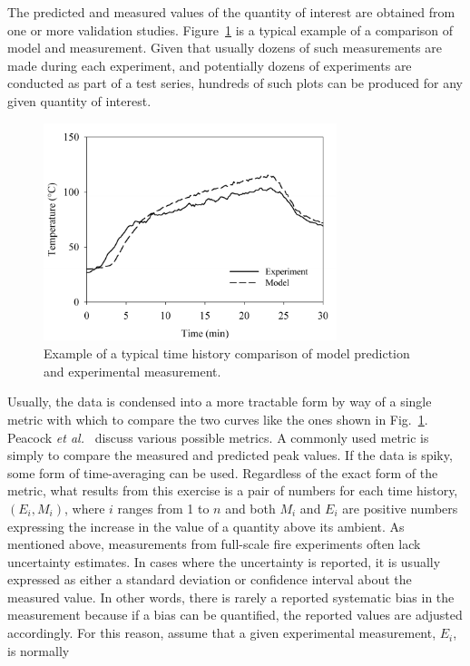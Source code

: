 The predicted and measured values of the quantity of interest are obtained from one or more validation studies.
Figure~\ref{temp_history} is a typical example of a comparison of model and measurement. Given that usually
dozens of such measurements are made during each experiment,
and potentially dozens of experiments are conducted as part of a test series, hundreds of such plots can be
produced for any given quantity of interest.
\begin{figure}[ht]
\begin{center}
\includegraphics[height=2.5in]{FIGURES/sample_time_history}
\end{center}
\caption[Sample time history plots.]{Example of a typical time history comparison of model prediction and experimental measurement.}
\label{temp_history}
\end{figure}
Usually, the data is condensed into a more tractable form by way of a single metric with which to
compare the two curves like the ones shown in Fig.~\ref{temp_history}. Peacock {\em et al.}~\cite{Peacock:FSJ1999}
discuss various possible metrics. A commonly used metric is simply to compare the measured and predicted peak values.
If the data is spiky, some form of time-averaging can be used. Regardless of the exact form of the metric, what results from
this exercise is a pair of numbers for each time history, $(E_i,M_i)$, where $i$ ranges from 1 to $n$ and both $M_i$ and $E_i$ are positive numbers
expressing the increase in the value of a quantity above its ambient.
As mentioned above, measurements from full-scale fire experiments often lack uncertainty estimates. In cases where the uncertainty is
reported, it is usually expressed as either a standard deviation or confidence interval about the measured value. In other words, there is rarely
a reported systematic bias in the measurement because if a bias can be quantified, the reported values are adjusted accordingly.
For this reason, assume that a given experimental measurement, $E_i$, is normally
